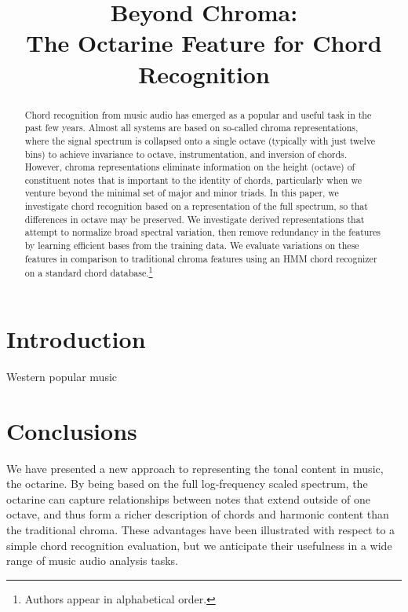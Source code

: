 \documentclass{article}
\title{Beyond Chroma: \\The Octarine Feature for Chord Recognition}
\begin{document}
%
\maketitle
%
\begin{abstract}
Chord recognition from music audio has emerged as a popular and useful task in 
the past few years.  Almost all systems are based on so-called chroma representations, 
where the signal spectrum is collapsed onto a single octave (typically with just twelve 
bins) to achieve invariance to octave, instrumentation, and inversion of chords.  However, 
chroma representations eliminate information on the height (octave) of constituent notes 
that is important to the identity of chords, particularly when we venture beyond the 
minimal set of major and minor triads.  In this paper, we investigate chord recognition based 
on a representation of the full spectrum, so that differences in octave may be preserved.  
We investigate derived representations that attempt to normalize broad spectral variation, then 
remove redundancy in the features by learning efficient bases from the training data.  We 
evaluate variations on these features in comparison to traditional chroma features using an 
HMM chord recognizer on a standard chord database.\footnote{Authors appear in alphabetical order.}

\end{abstract}
%
\section{Introduction}\label{sec:introduction}
Western popular music 

\section{Conclusions}\label{sec:conclus}

We have presented a new approach to representing the tonal content in music, 
the octarine.  By being based on the full log-frequency scaled spectrum, the 
octarine can capture relationships between notes that extend outside of one 
octave, and thus form a richer description of chords and harmonic content than 
the traditional chroma.  These advantages have been illustrated with respect to 
a simple chord recognition evaluation, but we anticipate their usefulness in a wide 
range of music audio analysis tasks.


\end{document}
